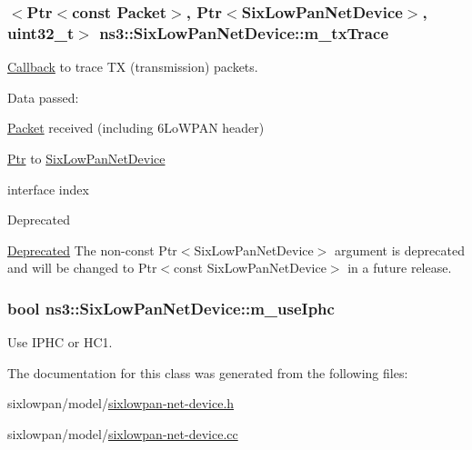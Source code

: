 \subsubsection[{\texorpdfstring{m\+\_\+tx\+Trace}{m_txTrace}}]{$<${\bf Ptr}$<$const {\bf Packet}$>$, {\bf Ptr}$<${\bf Six\+Low\+Pan\+Net\+Device}$>$, uint32\+\_\+t$>$ ns3\+::\+Six\+Low\+Pan\+Net\+Device\+::m\+\_\+tx\+Trace\hspace{0.3cm}{\ttfamily [private]}}\hypertarget{classns3_1_1SixLowPanNetDevice_a6d80896d0b58fd8a5577c65a060ad3b1}{}\label{classns3_1_1SixLowPanNetDevice_a6d80896d0b58fd8a5577c65a060ad3b1}


\hyperlink{classns3_1_1Callback}{Callback} to trace TX (transmission) packets. 

Data passed\+: \begin{DoxyItemize}
\item \hyperlink{classns3_1_1Packet}{Packet} received (including 6\+Lo\+W\+P\+AN header) \item \hyperlink{classns3_1_1Ptr}{Ptr} to \hyperlink{classns3_1_1SixLowPanNetDevice}{Six\+Low\+Pan\+Net\+Device} \item interface index \begin{DoxyRefDesc}{Deprecated}
\item[\hyperlink{deprecated__deprecated000028}{Deprecated}]The non-\/const {\ttfamily Ptr$<$\+Six\+Low\+Pan\+Net\+Device$>$} argument is deprecated and will be changed to {\ttfamily Ptr$<$const Six\+Low\+Pan\+Net\+Device$>$} in a future release. \end{DoxyRefDesc}
\end{DoxyItemize}
\subsubsection[{\texorpdfstring{m\+\_\+use\+Iphc}{m_useIphc}}]{\setlength{\rightskip}{0pt plus 5cm}bool ns3\+::\+Six\+Low\+Pan\+Net\+Device\+::m\+\_\+use\+Iphc\hspace{0.3cm}{\ttfamily [private]}}\hypertarget{classns3_1_1SixLowPanNetDevice_a304a0244019df2ca598b655210d82533}{}\label{classns3_1_1SixLowPanNetDevice_a304a0244019df2ca598b655210d82533}


Use I\+P\+HC or H\+C1. 



The documentation for this class was generated from the following files\+:\begin{DoxyCompactItemize}
\item 
sixlowpan/model/\hyperlink{sixlowpan-net-device_8h}{sixlowpan-\/net-\/device.\+h}\item 
sixlowpan/model/\hyperlink{sixlowpan-net-device_8cc}{sixlowpan-\/net-\/device.\+cc}\end{DoxyCompactItemize}

